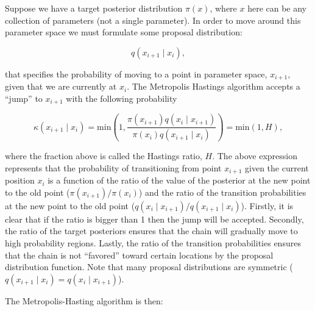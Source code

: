 

Suppose we have a target posterior distribution $\pi(x)$, where $x$ here can be any collection of parameters (not a single parameter). In order to move around this parameter space we must formulate some proposal distribution:

$$q(x_{i+1}\mid x_i),$$

that specifies the probability of moving to a point in parameter space, $x_{i+1},$ given that we are currently at $x_i$. The Metropolis Hastings algorithm accepts a ``jump'' to $x_{i+1}$ with the following probability

$$\kappa(x_{i+1}\mid x_i) = \mathrm{min}\left(1, \frac{\pi(x_{i+1})q(x_i\mid x_{i+1})}{\pi(x_{i})q(x_{i+1}\mid x_{i})}\right) = \mathrm{min}(1, H),$$

where the fraction above is called the Hastings ratio, $H$. The above expression represents that the probability of transitioning from point $x_{i+1}$ given the current position $x_{i}$ is a function of the ratio of the value of the posterior at the new point to the old point (\ie $\pi(x_{i+1})/\pi(x_i)$) and the ratio of the transition probabilities at the new point to the old point (\ie $q(x_i\mid x_{i+1})/q(x_{i+1}\mid x_i)$). Firstly, it is clear that if the ratio is bigger than 1 then the jump will be accepted. Secondly, the ratio of the target posteriors ensures that the chain will gradually move to high probability regions. Lastly, the ratio of the transition probabilities ensures that the chain is not ``favored'' toward certain locations by the proposal distribution function. Note that many proposal distributions are symmetric (\ie $q(x_{i+1}\mid x_i) = q(x_i\mid x_{i+1})$).

The Metropolis-Hasting algorithm is then:

